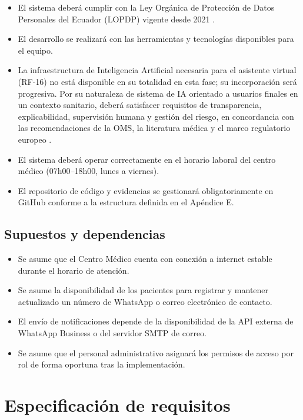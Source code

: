 \documentclass[11pt,a4paper]{article}
\providecommand{\tightlist}{%
	\setlength{\itemsep}{0pt}\setlength{\parskip}{0pt}}
\begin{document}
	\begin{itemize}
		\tightlist
		\item
		El sistema deberá cumplir con la Ley Orgánica de Protección de Datos Personales del Ecuador (LOPDP) vigente desde 2021 \cite{loppd}.
		\item
		El desarrollo se realizará con las herramientas y tecnologías disponibles para el equipo.
		\item
		La infraestructura de Inteligencia Artificial necesaria para el asistente virtual (RF-16) no está disponible en su totalidad en esta fase; su incorporación será progresiva. Por su naturaleza de sistema de IA orientado a usuarios finales en un contexto sanitario, deberá satisfacer requisitos de transparencia, explicabilidad, supervisión humana y gestión del riesgo, en concordancia con las recomendaciones de la OMS, la literatura médica y el marco regulatorio europeo \cite{whoai2021,topol2019,rajkomar2019,euaiact2024}.
		\item
		El sistema deberá operar correctamente en el horario laboral del centro médico (07h00--18h00, lunes a viernes).
		\item
		El repositorio de código y evidencias se gestionará obligatoriamente en GitHub conforme a la estructura definida en el Apéndice E.
	\end{itemize}
	
	\subsection{ Supuestos y dependencias}
	
	\begin{itemize}
		\tightlist
		\item
		Se asume que el Centro Médico cuenta con conexión a internet estable durante el horario de atención.
		\item
		Se asume la disponibilidad de los pacientes para registrar y mantener actualizado un número de WhatsApp o correo electrónico de contacto.
		\item
		El envío de notificaciones depende de la disponibilidad de la API externa de WhatsApp Business o del servidor SMTP de correo.
		\item
		Se asume que el personal administrativo asignará los permisos de acceso por rol de forma oportuna tras la implementación.
	\end{itemize}
	
	
	
	\section{ Especificación de requisitos}
	
\end{document}
